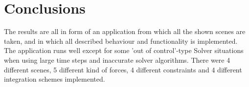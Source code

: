 \chapter{Conclusions} 
The results are all in form of an application from which all the shown scenes are taken, and in which all described behaviour and functionality is implemented. The application runs well except for some 'out of control'-type Solver situations when using large time steps and inaccurate solver algorithms. There were 4 different scenes, 5 different kind of forces, 4 different constraints and 4 different integration schemes implemented. 